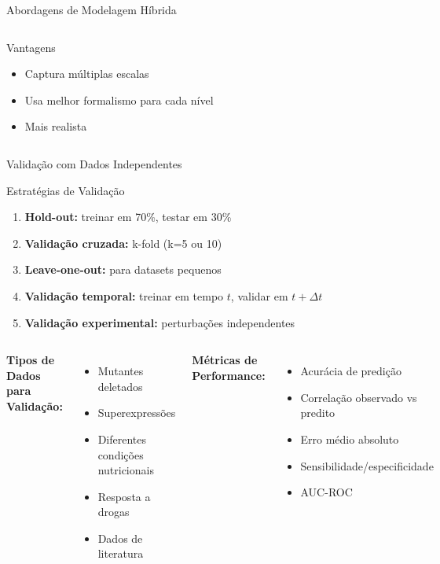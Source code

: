 \begin{frame}{Abordagens de Modelagem Híbrida}
\begin{columns}
\vspace{0.2cm}

\begin{exampleblock}{Vantagens}
\begin{itemize}
    \item Captura múltiplas escalas
    \item Usa melhor formalismo para cada nível
    \item Mais realista
\end{itemize}
\end{exampleblock}
\end{columns}
\end{frame}

\begin{frame}{Validação com Dados Independentes}
\begin{block}{Estratégias de Validação}
\begin{enumerate}
    \item \textbf{Hold-out:} treinar em 70\%, testar em 30\%
    \item \textbf{Validação cruzada:} k-fold (k=5 ou 10)
    \item \textbf{Leave-one-out:} para datasets pequenos
    \item \textbf{Validação temporal:} treinar em tempo $t$, validar em $t+\Delta t$
    \item \textbf{Validação experimental:} perturbações independentes
\end{enumerate}
\end{block}

\vspace{0.3cm}

\begin{columns}
\textbf{Tipos de Dados para Validação:}
\begin{itemize}
    \item Mutantes deletados
    \item Superexpressões
    \item Diferentes condições nutricionais
    \item Resposta a drogas
    \item Dados de literatura
\end{itemize}

\textbf{Métricas de Performance:}
\begin{itemize}
    \item Acurácia de predição
    \item Correlação observado vs predito
    \item Erro médio absoluto
    \item Sensibilidade/especificidade
    \item AUC-ROC
\end{itemize}
\end{columns}
\end{frame}

